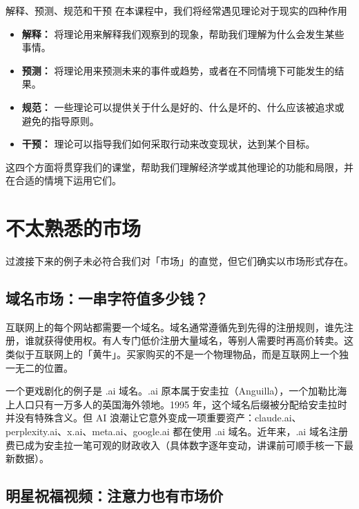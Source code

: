 \documentclass[10pt,a4paper]{ctexart}
\newcommand{\transitionnote}[1]{%
  \begin{conceptbox}{过渡}#1\end{conceptbox}%
}
\begin{document}
\begin{conceptbox}{解释、预测、规范和干预}
    在本课程中，我们将经常遇见理论对于现实的四种作用
    \begin{itemize}
        \item \textbf{解释：} 将理论用来解释我们观察到的现象，帮助我们理解为什么会发生某些事情。
        \item \textbf{预测：} 将理论用来预测未来的事件或趋势，或者在不同情境下可能发生的结果。
        \item \textbf{规范：} 一些理论可以提供关于什么是好的、什么是坏的、什么应该被追求或避免的指导原则。
        \item \textbf{干预：} 理论可以指导我们如何采取行动来改变现状，达到某个目标。    
    \end{itemize}

    这四个方面将贯穿我们的课堂，帮助我们理解经济学或其他理论的功能和局限，并在合适的情境下运用它们。

\end{conceptbox}



\section{不太熟悉的市场}

\transitionnote{接下来的例子未必符合我们对「市场」的直觉，但它们确实以市场形式存在。}

\subsection{域名市场：一串字符值多少钱？}

互联网上的每个网站都需要一个域名。域名通常遵循先到先得的注册规则，谁先注册，谁就获得使用权。有人专门低价注册大量域名，等别人需要时再高价转卖。这类似于互联网上的「黄牛」。买家购买的不是一个物理物品，而是互联网上一个独一无二的位置。

一个更戏剧化的例子是 .ai 域名。.ai 原本属于安圭拉（Anguilla），一个加勒比海上人口只有一万多人的英国海外领地。1995 年，这个域名后缀被分配给安圭拉时并没有特殊含义。但 AI 浪潮让它意外变成一项重要资产：claude.ai、perplexity.ai、x.ai、meta.ai、google.ai 都在使用 .ai 域名。近年来，.ai 域名注册费已成为安圭拉一笔可观的财政收入（具体数字逐年变动，讲课前可顺手核一下最新数据）。

\subsection{明星祝福视频：注意力也有市场价}
\end{document}
